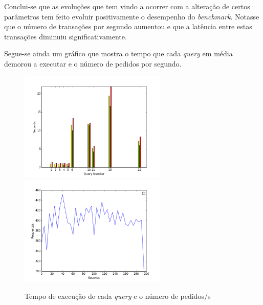 Conclui-se que as evoluções que tem vindo a ocorrer com a alteração de certos parâmetros tem feito evoluir positivamente o desempenho do \textit{benchmark}. Notasse que o número de transações por segundo aumentou e que a latência entre estas transações diminuiu significativamente.

Segue-se ainda um gráfico que mostra o tempo que cada \textit{query} em média demorou a executar e o número de pedidos por segundo.

\begin{figure}[ht!]
\centering
\includegraphics[width=70mm]{img/questao_3/figure_1.png}
\includegraphics[width=70mm]{img/questao_3/figure_2.png}
\caption{Tempo de execução de cada \textit{query} e o número de pedidos/s}
\end{figure}
